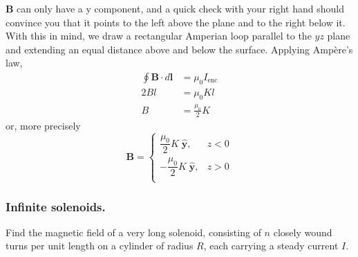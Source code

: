 \documentclass[../../../main.tex]{subfiles}
\begin{document}
\textbf{B} can only have a y component, and a quick check with your right hand should convince you that it points to the left above the plane and to the right below it. With this in mind, we draw a rectangular Amperian loop parallel to the $yz$ plane and extending an equal distance above and below the 
surface. Applying Ampère’s law,
\begin{align*}
    \oint \mathbf{B}\cdot d\mathbf{l}&=\mu_0I_{\text{enc}}\\
    2Bl&=\mu_0Kl\\
    B&=\frac{\mu_0}{2}K
\end{align*}
or, more precisely
\begin{equation*}
    \mathbf{B}=
    \begin{cases}
        \dfrac{\mu_0}{2}K\;\mathbf{\hat{y}},&z<0\\
        -\dfrac{\mu_0}{2}K\;\mathbf{\hat{y}},&z>0\\
    \end{cases}
\end{equation*}

\subsubsection*{Inﬁnite solenoids.} Find the magnetic ﬁeld of a very long solenoid, consisting of $n$ closely wound turns per unit length on a cylinder of radius $R$, each carrying a steady current $I$.

\begin{figure*}[ht]
    \centering
\end{figure*}
\end{document}
